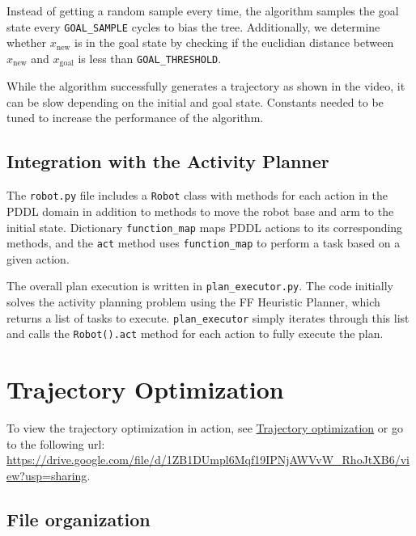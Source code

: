 \documentclass{article}
\begin{document}
Instead of getting a random sample every time, the algorithm samples the goal state every \texttt{GOAL\_SAMPLE} cycles to bias the tree. Additionally, we determine whether $x_\text{new}$ is in the goal state by checking if the euclidian distance between $x_\text{new}$ and $x_\text{goal}$ is less than \texttt{GOAL\_THRESHOLD}. 

While the algorithm successfully generates a trajectory as shown in the video, it can be slow depending on the initial and goal state. Constants needed to be tuned to increase the performance of the algorithm.

\subsection{Integration with the Activity Planner}

The \texttt{robot.py} file includes a \texttt{Robot} class with methods for each action in the PDDL domain in addition to methods to move the robot base and arm to the initial state. Dictionary \texttt{function\_map} maps PDDL actions to its corresponding methods, and the \texttt{act} method uses \texttt{function\_map} to perform a task based on a given action.

The overall plan execution is written in \texttt{plan\_executor.py}. The code initially solves the activity planning problem using the FF Heuristic Planner, which returns a list of tasks to execute. \texttt{plan\_executor} simply iterates through this list and calls the \texttt{Robot().act} method for each action to fully execute the plan.

\section{Trajectory Optimization}

To view the trajectory optimization in action, see \href{https://drive.google.com/file/d/1ZB1DUmpl6Mqf19IPNjAWVvW_RhoJtXB6/view?usp=sharing}{Trajectory optimization} or go to the following url: \url{https://drive.google.com/file/d/1ZB1DUmpl6Mqf19IPNjAWVvW_RhoJtXB6/view?usp=sharing}.

\subsection{File organization}
\end{document}
